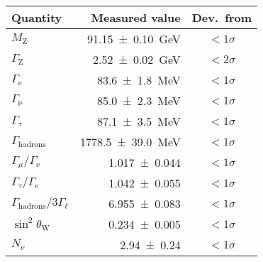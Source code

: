 \begin{tabular}{lrc}
	\toprule
	Quantity & Measured value & Dev.\ from \cite{pdg}\\
	\midrule
	$M_\mathrm{Z}$ & \SI{91.15 +- 0.10}{GeV} & \color{Green}$< 1\sigma$ \\
	$\Gamma_\mathrm{Z}$ & \SI{2.52 +- 0.02}{GeV} & \color{Orange}$< 2\sigma$ \\
	\midrule
	$\Gamma_\mathrm{e}$ & \SI{83.6 +- 1.8}{MeV} & \color{Green}$< 1\sigma$ \\
	$\Gamma_\mathrm{\mu}$ & \SI{85.0 +- 2.3}{MeV} & \color{Green}$< 1\sigma$ \\
	$\Gamma_\mathrm{\tau}$ & \SI{87.1 +- 3.5}{MeV} & \color{Green}$< 1\sigma$ \\
	$\Gamma_\mathrm{hadrons}$ & \SI{1778.5 +- 39.0}{MeV} & \color{Green}$< 1\sigma$ \\
	\midrule
	$\Gamma_\mu / \Gamma_\mathrm{e}$ & \num{1.017 +-0.044} &\color{Green}$< 1\sigma$ \\
	$\Gamma_\tau / \Gamma_\mathrm{e}$ & \num{1.042 +-0.055} &\color{Green}$< 1\sigma$ \\
	$\Gamma_\mathrm{hadrons} / 3\Gamma_\ell$ & \num{6.955 +- 0.083} & \color{Green}$< 1\sigma$ \\
	\midrule
	$\sin^2\theta_\mathrm{W}$ & \num{0.234 +- 0.005} & \color{Green}$< 1\sigma$ \\
	$N_\nu$ & \num{2.94 +- 0.24} & \color{Green}$< 1\sigma$ \\
	\bottomrule
\end{tabular}